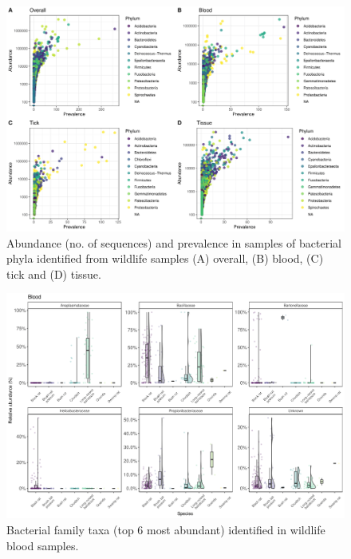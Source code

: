 \documentclass[a4paper, nobind]{templates/ociamthesis}
\begin{document}
\newpage

\begin{figure}
\includegraphics[width=0.95\linewidth]{figures/ms-figs-appendix/FigA-3.5} \caption[Phylum level taxa abundance.]{Abundance (no. of sequences) and prevalence in samples of bacterial phyla identified from wildlife samples (A) overall, (B) blood, (C) tick and (D) tissue.}\label{fig:FA35}
\end{figure}

\newpage

\begin{figure}
\includegraphics[width=0.8\linewidth]{figures/ms-figs-appendix/FigA-3.6} \caption[Bacterial family taxa identified in wildlife blood samples.]{Bacterial family taxa (top 6 most abundant) identified in wildlife blood samples.}\label{fig:FA36}
\end{figure}

\newpage
\end{document}
